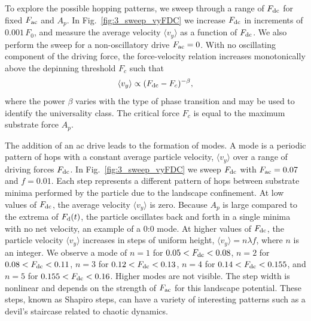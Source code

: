 \documentclass[preprint,showpacs,preprintnumbers,amsmath,amssymb,aps,prb]{revtex4-1}
\theoremstyle{remark}
\begin{document}
To explore the possible hopping patterns,
we sweep through a range of $F_{\rm dc}$ for fixed $F_{\rm ac}$ and $A_p$.
In Fig.~\ref{fig:3_sweep_vyFDC} 
we increase $F_{\rm dc}$ in increments of $0.001\,F_0$,
and 
measure the average velocity $\langle v_y \rangle $ 
as a function of $F_{\rm dc}$.
We also perform the sweep for a non-oscillatory drive $F_{\rm ac} = 0$.
With no oscillating component of the driving force,
  the force-velocity relation increases monotonically 
  above the depinning threshold $F_c$ such that
  \begin{equation}
    \langle v_y \rangle \propto (F_{\rm dc}-F_c)^{-\beta},
  \end{equation}
  where the power $\beta$ varies with the
  type of phase transition and 
  may 
  be used to identify the universality class.\cite{Reichhardt2017} %
  The critical force $F_c$ is equal to the maximum substrate force
  $A_p$.
  
The addition of an ac drive leads
  to the formation of modes.
  A mode is a periodic pattern of hops
  with a constant average particle velocity, $\langle {v}_{y} \rangle$
  over a range of driving forces $F_{\rm dc}$.
  In Fig.~\ref{fig:3_sweep_vyFDC}
  we sweep $F_{\rm dc}$
  with $F_{\rm ac} = 0.07$ and $f=0.01$.
Each step represents a different pattern of hops
between substrate minima
performed by the particle
due to the landscape confinement.  
At 
low values of $F_{\rm dc}$, the average velocity $\langle v_y \rangle$ is zero.
Because 
$A_p$ is large compared to the extrema of $F_{\rm d}(t)$,
the particle oscillates back and forth
in a single minima with no net velocity, an example of 
a 0:0 mode.
At higher values of $F_{\rm dc}$, the particle velocity 
$\langle v_{y} \rangle$ increases in steps of uniform height,
$\langle v_{y} \rangle = n \lambda f$,
where $n$ is an integer.
We observe a mode of $n=1$
for   $0.05 < F_{\rm dc} < 0.08$,
$n=2$ for $0.08 < F_{\rm dc} < 0.11$,
$n=3$ for $0.12 < F_{\rm dc} < 0.13$,
$n=4$ for $0.14 < F_{\rm dc} < 0.155$, and 
$n=5$ for $0.155 < F_{\rm dc} < 0.16$.
Higher modes are not visible.
The step width is nonlinear
and depends on the strength of $F_{\rm ac}$
for this landscape potential.\cite{Reichhardt2000,Juniper2017}
These steps, known as Shapiro steps, can have a variety of
interesting patterns
such as a devil's staircase related to chaotic dynamics.\cite{Bak1986}
\end{document}
